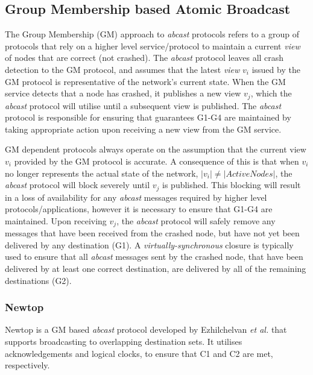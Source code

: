         
	\subsection{Group Membership based Atomic Broadcast}
	The Group Membership (GM) approach to \emph{abcast} protocols refers to a group of protocols that rely on a higher level service/protocol to maintain a current \emph{view} of nodes that are correct (not crashed).  The \emph{abcast} protocol leaves all crash detection to the GM protocol, and assumes that the latest \emph{view} $v_i$ issued by the GM protocol is representative of the network's current state.  When the GM service detects that a node has crashed, it publishes a new view $v_j$, which the \emph{abcast} protocol will utilise until a subsequent view is published.  The \emph{abcast} protocol is responsible for ensuring that guarantees G1-G4 are maintained by taking appropriate action upon receiving a new view from the GM service.  
	
	GM dependent protocols always operate on the assumption that the current view $v_i$ provided by the GM protocol is accurate.  A consequence of this is that when $v_i$ no longer represents the actual state of the network, $\left\vert v_i \right\vert \neq \left\vert ActiveNodes \right\vert$, the \emph{abcast} protocol will block severely until $v_j$ is published.  This blocking will result in a loss of availability for any \emph{abcast} messages required by higher level protocols/applications, however it is necessary to ensure that G1-G4 are maintained.  Upon receiving $v_j$, the \emph{abcast} protocol will safely remove any messages that have been received from the crashed node, but have not yet been delivered by any destination (G1).  A \emph{virtually-synchronous}\cite{Birman:1991:LCA:128738.128742} closure is typically used to ensure that all \emph{abcast} messages sent by the crashed node, that have been delivered by at least one correct destination, are delivered by all of the remaining destinations (G2).  

        \subsubsection{Newtop} \label{ssec:newtop}
        Newtop \citep{Ezhilchelvan:1995:NFG:876885.880005} is a GM based \emph{abcast} protocol developed by Ezhilchelvan \emph{et al.} that supports broadcasting to overlapping destination sets.  It utilises acknowledgements and logical clocks, to ensure that C1 and C2 are met, respectively.  
        
